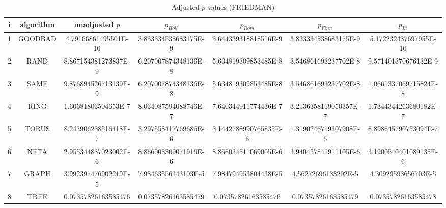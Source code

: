 \documentclass[a4paper,10pt]{article}
\begin{document}
\begin{landscape}
\begin{table}[!htp]
\centering\scriptsize
\caption{Adjusted $p$-values (FRIEDMAN)}
\begin{tabular}{ccccccc}
i&algorithm&unadjusted $p$&$p_{Holl}$&$p_{Rom}$&$p_{Finn}$&$p_{Li}$\\
\hline
1& GOODBAD&4.79166861495501E-10&3.833334538683175E-9&3.644339318818516E-9&3.833334538683175E-9&5.172232487697955E-10\\
2& RAND&8.867154381273837E-9&6.207007874348136E-8&5.634819309853485E-8&3.546861693237702E-8&9.571401370676132E-9\\
3& SAME&9.876894526713139E-9&6.207007874348136E-8&5.634819309853485E-8&3.546861693237702E-8&1.0661337069715824E-8\\
4& RING&1.60681803504653E-7&8.034087594088746E-7&7.640344911774436E-7&3.2136358119050357E-7&1.7344344263680182E-7\\
5& TORUS&8.243906238516418E-7&3.297558417769686E-6&3.1442788990765835E-6&1.3190246719307908E-6&8.898645790753094E-7\\
6& NETA&2.955344837023002E-6&8.866008309071916E-6&8.866034511069005E-6&3.940457841911105E-6&3.1900540401089135E-6\\
7& GRAPH&3.992397476902219E-5&7.98463556143103E-5&7.984794953804438E-5&4.56272696183202E-5&4.30929593656703E-5\\
8& TREE&0.07357826163585476&0.07357826163585479&0.07357826163585476&0.07357826163585479&0.07357826163585478\\
\hline
\end{tabular}
\end{table}


\newpage


\end{landscape}
\end{document}
